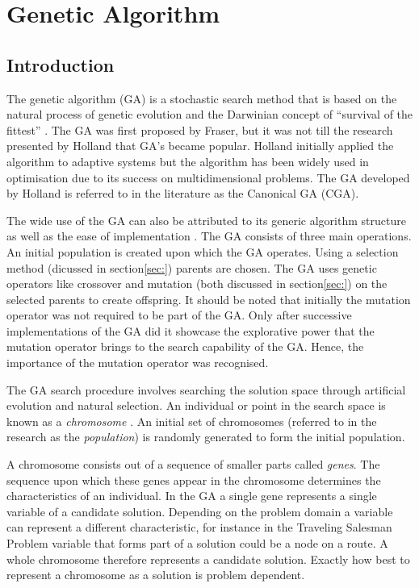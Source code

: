 \section{Genetic Algorithm}
\label{sec:geneticalgorithm}
\subsection{Introduction}
The genetic algorithm (GA) is a stochastic search method that is based on the natural process of genetic evolution and the Darwinian concept of ``survival of the fittest'' \cite{DistributedHierarchicalGA,AcceleratingGA,AdaptiveSAGA,FamilyGA}. The \gls{GA} was first proposed by Fraser, but it was not till the research presented by Holland that \gls{GA}'s became popular\cite{CompuIntelligenceIntro}. Holland initially applied the algorithm to adaptive systems but the algorithm has been widely used in optimisation due to its success on multidimensional problems\cite{ParallelGASA,DistributedHierarchicalGA,FamilyGA}. The \gls{GA} developed by Holland is referred to in the literature as the Canonical \gls{GA} (CGA)\cite{CompuIntelligenceIntro}.

The wide use of the \gls{GA} can also be attributed to its generic algorithm structure as well as the ease of implementation \cite{FamilyGA,AdaptiveSAGA}. The \gls{GA} consists of three main operations. An initial population is created upon which the GA operates. Using a selection method (dicussed in section\ref{sec:}) parents are chosen. The \gls{GA} uses genetic operators like crossover and mutation (both discussed in section\ref{sec:}) on the selected parents to create offspring\cite{GAGoldberg}. It should be noted that initially the mutation operator was not required to be part of the \gls{GA}. Only after successive implementations of the \gls{GA} did it showcase the explorative power that the mutation operator brings to the search capability of the \gls{GA}. Hence, the importance of the mutation operator was recognised\cite{CompuIntelligenceIntro}. 


The \gls{GA} search procedure involves searching the solution space through artificial evolution and natural selection\cite{FamilyGA,MultiPopGA,HybridIntelliGA}. An individual or point in the search space is known as a \emph{chromosome} \cite{HumanPassiveGA}. An initial set of chromosomes (referred to in the research as the \emph{population}) is randomly generated to form the initial population\cite{FamilyGA,HybridIntelliGA,AcceleratingGA,MultiPopGA}. 

A chromosome consists out of a sequence of smaller parts called \emph{genes}\cite{CompuIntelligenceIntro}. The sequence upon which these genes appear in the chromosome determines the characteristics of an individual\cite{CompuIntelligenceIntro}. In the \gls{GA} a single gene represents a single variable of a candidate solution. Depending on the problem domain a variable can represent a different characteristic, for instance in the Traveling Salesman Problem  variable that forms part of a solution could be a node on a route\cite{FamilyGA,AcceleratingGA}. A whole chromosome therefore represents a candidate solution\cite{FamilyGA,AcceleratingGA}. Exactly how best to represent a chromosome as a solution is problem dependent\cite{CompuIntelligenceIntro}.

